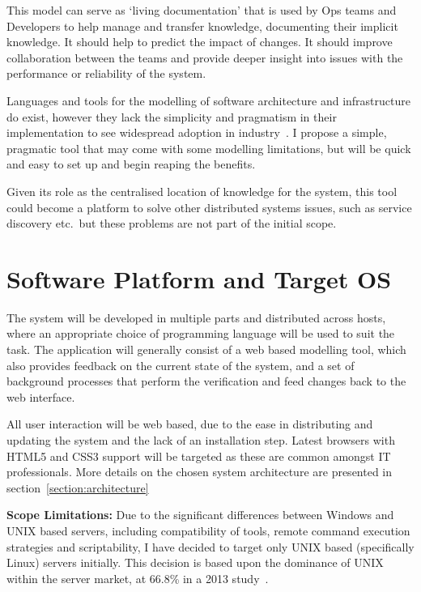\documentclass{cshonours}
\begin{document}
This model can serve as `living documentation' that is used by Ops teams and Developers to help manage and transfer knowledge, documenting their implicit knowledge. It should help to predict the impact of changes. It should improve collaboration between the teams and provide deeper insight into issues with the performance or reliability of the system.

Languages and tools for the modelling of software architecture and infrastructure do exist, however they lack the simplicity and pragmatism in their implementation to see widespread adoption in industry~\cite{ModellingAdoption}. I propose a simple, pragmatic tool that may come with some modelling limitations, but will be quick and easy to set up and begin reaping the benefits.

Given its role as the centralised location of knowledge for the system, this tool could become a platform to solve other distributed systems issues, such as service discovery etc.\ but these problems are not part of the initial scope.

\section{Software Platform and Target OS}

The system will be developed in multiple parts and distributed across hosts, where an appropriate choice of programming language will be used to suit the task. The application will generally consist of a web based modelling tool, which also provides feedback on the current state of the system, and a set of background processes that perform the verification and feed changes back to the web interface.

All user interaction will be web based, due to the ease in distributing and updating the system and the lack of an installation step. Latest browsers with HTML5 and CSS3 support will be targeted as these are common amongst IT professionals. More details on the chosen system architecture are presented in section~\ref{section:architecture}

\textbf{Scope Limitations:} Due to the significant differences between Windows and UNIX based servers, including compatibility of tools, remote command execution strategies and scriptability, I have decided to target only UNIX based (specifically Linux) servers initially. This decision is based upon the dominance of UNIX within the server market, at 66.8\% in a 2013 study~\cite{UnixMarketShare}.
\end{document}
